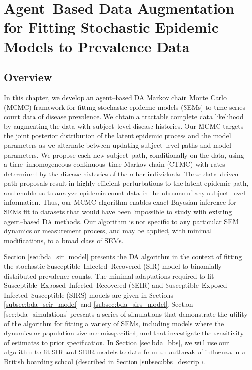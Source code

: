 \chapter{Agent--Based Data Augmentation for Fitting Stochastic Epidemic Models to Prevalence Data}
\label{chap:bda_for_fitting_sems_to_prevalence_data}

\section{Overview}
\label{sec:bda_overview}

In this chapter, we develop an agent--based DA Markov chain Monte Carlo (MCMC) framework for fitting stochastic epidemic models (SEMs) to time series count data of disease prevalence. We obtain a tractable complete data likelihood by augmenting the data with subject--level disease histories. Our MCMC targets the joint posterior distribution of the latent epidemic process and the model parameters as we alternate between updating subject--level paths and model parameters. We propose each new subject--path, conditionally on the data, using a time--inhomogeneous continuous--time Markov chain (CTMC) with rates determined by the disease histories of the other individuals. These data--driven path proposals result in highly efficient perturbations to the latent epidemic path, and enable us to analyze epidemic count data in the absence of any subject--level information. Thus, our MCMC algorithm enables exact Bayesian inference for SEMs fit to datasets that would have been impossible to study with existing agent--based DA methods. Our algorithm is not specific to any particular SEM dynamics or measurement process, and may be applied, with minimal modifications, to a broad class of SEMs. 

Section \ref{sec:bda_sir_model} presents the DA algorithm in the context of fitting the stochastic Susceptible--Infected--Recovered (SIR) model to binomially distributed prevalence counts. The minimal adaptations required to fit Susceptible--Exposed--Infected--Recovered (SEIR) and Susceptible--Exposed--Infected--Susceptible (SIRS) models are given in Sections  \ref{subsec:bda_seir_model} and \ref{subsec:bda_sirs_model}. Section \ref{sec:bda_simulations} presents a series of simulations that demonstrate the utility of the algorithm for fitting a variety of SEMs, including models where the dynamics or population size are misspecified, and that investigate the sensitivity of estimates to prior specification. In Section \ref{sec:bda_bbs}, we will use our algorithm to fit SIR and SEIR models to data from an outbreak of influenza in a British boarding school (described in Section \ref{subsec:bbs_descrip}).

